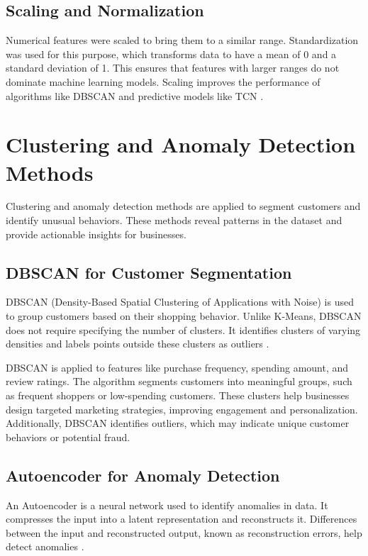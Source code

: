 \documentclass[12pt, a4paper,twoside]{report}
\theoremstyle{plain} %
\theoremstyle{definition} %
\theoremstyle{remark} %
\numberwithin{equation}{chapter}
\begin{document}
\subsection{Scaling and Normalization}

Numerical features were scaled to bring them to a similar range. Standardization was used for this purpose, which transforms data to have a mean of 0 and a standard deviation of 1. This ensures that features with larger ranges do not dominate machine learning models. Scaling improves the performance of algorithms like DBSCAN and predictive models like TCN \cite{muller2016introduction}.

\section{Clustering and Anomaly Detection Methods}

Clustering and anomaly detection methods are applied to segment customers and identify unusual behaviors. These methods reveal patterns in the dataset and provide actionable insights for businesses.

\subsection{DBSCAN for Customer Segmentation}

DBSCAN (Density-Based Spatial Clustering of Applications with Noise) is used to group customers based on their shopping behavior. Unlike K-Means, DBSCAN does not require specifying the number of clusters. It identifies clusters of varying densities and labels points outside these clusters as outliers \cite{ester1996density}.

DBSCAN is applied to features like purchase frequency, spending amount, and review ratings. The algorithm segments customers into meaningful groups, such as frequent shoppers or low-spending customers. These clusters help businesses design targeted marketing strategies, improving engagement and personalization. Additionally, DBSCAN identifies outliers, which may indicate unique customer behaviors or potential fraud.

\subsection{Autoencoder for Anomaly Detection}

An Autoencoder is a neural network used to identify anomalies in data. It compresses the input into a latent representation and reconstructs it. Differences between the input and reconstructed output, known as reconstruction errors, help detect anomalies \cite{zhou2017autoencoder}.
\end{document}
